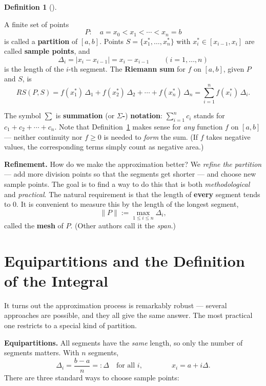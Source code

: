 \documentclass[
  letterpaper,
  DIV=11,
  numbers=noendperiod]{scrreprt}
\theoremstyle{plain}
\theoremstyle{plain}
\theoremstyle{definition}
\newtheorem{definition}{Definition}[chapter]
\theoremstyle{definition}
\theoremstyle{definition}
\theoremstyle{plain}
\theoremstyle{plain}
\theoremstyle{remark}
\begin{document}
\begin{definition}[]\protect\hypertarget{def-riemann-sum}{}\label{def-riemann-sum}

\hfill\break
A finite set of points \[
P:\quad a = x_0 < x_1 < \cdots < x_n = b
\] is called a \textbf{partition} of \([a,b]\). Points
\(S = \{x_1^*,\ldots,x_n^*\}\) with \(x_i^*\in[x_{i-1},x_i]\) are called
\textbf{sample points}, and \[
\Delta_i = \lvert x_i - x_{i-1} \rvert = x_i - x_{i-1} \qquad (i=1,\ldots,n)
\] is the length of the \(i\)-th segment. The \textbf{Riemann sum} for
\(f\) on \([a,b]\), given \(P\) and \(S\), is \[
RS(P,S) = f(x_1^*)\,\Delta_1 + f(x_2^*)\,\Delta_2 + \cdots + f(x_n^*)\,\Delta_n
= \sum_{i=1}^n f(x_i^*)\,\Delta_i .
\]

\end{definition}

The symbol \(\sum\) is \textbf{summation} (or \textbf{\(\Sigma\)-})
\textbf{notation}: \(\sum_{i=1}^n c_i\) stands for
\(c_1+c_2+\cdots+c_n\). Note that Definition~\ref{def-riemann-sum} makes
sense for \emph{any} function \(f\) on \([a,b]\) --- neither continuity
nor \(f\ge0\) is needed to \emph{form} the sum. (If \(f\) takes negative
values, the corresponding terms simply count as negative area.)

\textbf{Refinement.} How do we make the approximation better? We
\emph{refine the partition} --- add more division points so that the
segments get shorter --- and choose new sample points. The goal is to
find a way to do this that is both \emph{methodological} and
\emph{practical}. The natural requirement is that the length of
\textbf{every} segment tends to \(0\). It is convenient to measure this
by the length of the longest segment, \[
\|P\| := \max_{1\le i\le n}\Delta_i,
\] called the \textbf{mesh} of \(P\). (Other authors call it the
\emph{span}.)

\section{Equipartitions and the Definition of the
Integral}\label{equipartitions-and-the-definition-of-the-integral}

It turns out the approximation process is remarkably robust --- several
approaches are possible, and they all give the same answer. The most
practical one restricts to a special kind of partition.

\textbf{Equipartitions.} All segments have the \emph{same} length, so
only the number of segments matters. With \(n\) segments, \[
\Delta_i = \frac{b-a}{n} =: \Delta \quad\text{for all } i, \qquad\qquad x_i = a + i\Delta.
\] There are three standard ways to choose sample points:
\end{document}
